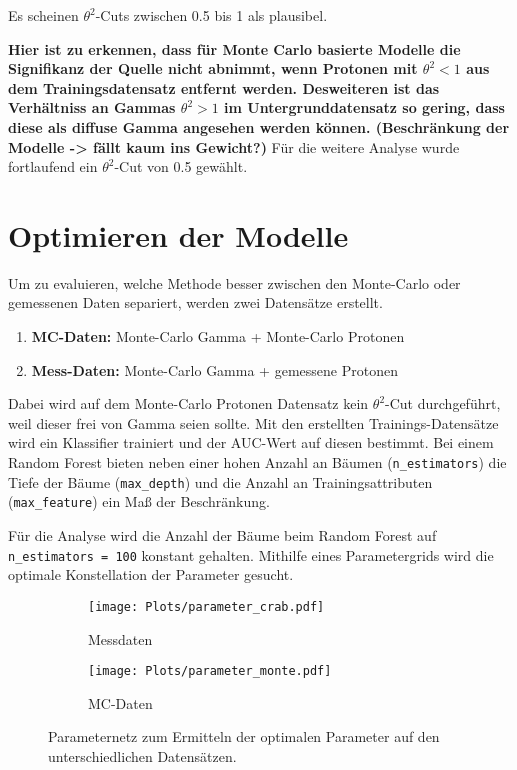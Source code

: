 Es scheinen $\theta^{2}$-Cuts zwischen \num{0.5} bis \num{1} als plausibel. 

\textbf{Hier ist zu erkennen, dass für Monte Carlo basierte Modelle die Signifikanz der Quelle nicht abnimmt, wenn Protonen mit $\theta^{2} < 1$ aus dem Trainingsdatensatz entfernt werden. 
Desweiteren ist das Verhältniss an Gammas $\theta^{2} > 1$ im Untergrunddatensatz so gering, dass diese als diffuse Gamma angesehen werden können. (Beschränkung der Modelle -> fällt kaum ins Gewicht?)} 
Für die weitere Analyse wurde fortlaufend ein $\theta^{2}$-Cut von \num{0.5} gewählt. 
\section{Optimieren der Modelle}
Um zu evaluieren, welche Methode besser zwischen den Monte-Carlo oder gemessenen Daten separiert, werden zwei Datensätze erstellt. 
\begin{enumerate}
  \item \textbf{MC-Daten:} Monte-Carlo Gamma + Monte-Carlo Protonen
  \item \textbf{Mess-Daten:} Monte-Carlo Gamma + gemessene Protonen 
\end{enumerate}
Dabei wird auf dem Monte-Carlo Protonen Datensatz kein $\theta^{2}$-Cut durchgeführt, weil dieser frei von Gamma seien sollte.
Mit den erstellten Trainings-Datensätze wird ein Klassifier trainiert und der AUC-Wert auf diesen bestimmt.
Bei einem Random Forest bieten neben einer hohen Anzahl an Bäumen (\texttt{n\_estimators}) die Tiefe der Bäume (\texttt{max\_depth}) und die Anzahl an Trainingsattributen (\texttt{max\_feature}) ein Maß der Beschränkung.

Für die Analyse wird die Anzahl der Bäume beim Random Forest auf \texttt{n\_estimators = 100} konstant gehalten. 
Mithilfe eines Parametergrids wird die optimale Konstellation der Parameter gesucht. 
\begin{figure}
  \begin{subfigure}[b]{0.5\textwidth}
	\texttt{[image: Plots/parameter\_crab.pdf]}
	\caption{Messdaten}
	\label{fig:messGrid}
  \end{subfigure}
  \begin{subfigure}[b]{0.5\textwidth}
	\texttt{[image: Plots/parameter\_monte.pdf]}
	\caption{MC-Daten}
	\label{fig:mcGrid}
  \end{subfigure}
  \caption{Parameternetz zum Ermitteln der optimalen Parameter auf den unterschiedlichen Datensätzen.}
\end{figure}

